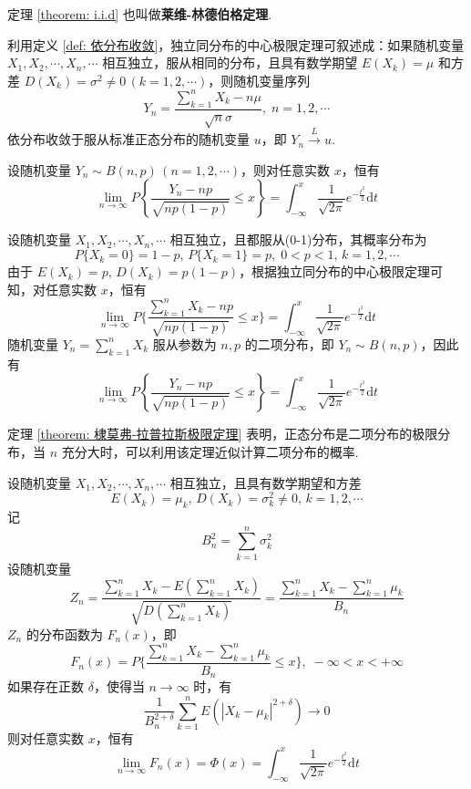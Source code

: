 定理 \ref{theorem: i.i.d} 也叫做\textbf{莱维-林德伯格定理}.

利用定义 \ref{def: 依分布收敛}，独立同分布的中心极限定理可叙述成：如果随机变量 $X_1,X_2,\cdots,X_n,\cdots$ 相互独立，服从相同的分布，且具有数学期望 $E(X_k) = \mu$ 和方差 $D(X_k) = \sigma^2 \not= 0 \, (k=1,2,\cdots)$，则随机变量序列
$$
Y_n = \dfrac{\displaystyle\sum_{k=1}^n X_k - n \mu}{\sqrt{n} \sigma}, \; n=1,2,\cdots
$$
依分布收敛于服从标准正态分布的随机变量 $u$，即 $Y_n \overset{L}{\longrightarrow} u$.

\begin{theorem} \label{theorem: 棣莫弗-拉普拉斯极限定理}
    设随机变量 $Y_n \sim B(n,p) \, (n=1,2,\cdots)$，则对任意实数 $x$，恒有
    $$
    \lim_{n \to \infty} P \left\{ \dfrac{Y_n - np}{\sqrt{np(1-p)}} \leqslant x \right\} = \int_{-\infty}^x \dfrac{1}{\sqrt{2\pi}} e^{-\frac{t^2}{2}} \text{d}t
    $$
\end{theorem}

\begin{myproof}
    设随机变量 $X_1,X_2,\cdots,X_n,\cdots$ 相互独立，且都服从(0-1)分布，其概率分布为
    $$
    P \{ X_k=0 \} = 1-p, \, P \{ X_k=1 \} = p, \; 0 < p < 1, \, k=1,2,\cdots
    $$
    由于 $E(X_k) = p, \, D(X_k) = p(1-p)$，根据独立同分布的中心极限定理可知，对任意实数 $x$，恒有
    $$
    \lim_{n \to \infty} P \Bigg\{ \dfrac{\displaystyle\sum_{k=1}^n X_k - np}{\sqrt{np(1-p)}} \leqslant x \Bigg\} = \int_{-\infty}^x \dfrac{1}{\sqrt{2\pi}} e^{-\frac{t^2}{2}} \text{d}t
    $$
    随机变量 $Y_n = \displaystyle\sum_{k=1}^n X_k$ 服从参数为 $n,p$ 的二项分布，即 $Y_n \sim B(n,p)$，因此有
    $$
    \lim_{n \to \infty} P \left\{ \dfrac{Y_n - np}{\sqrt{np(1-p)}} \leqslant x \right\} = \int_{-\infty}^x \dfrac{1}{\sqrt{2\pi}} e^{-\frac{t^2}{2}} \text{d}t
    $$
\end{myproof}

定理 \ref{theorem: 棣莫弗-拉普拉斯极限定理} 表明，正态分布是二项分布的极限分布，当 $n$ 充分大时，可以利用该定理近似计算二项分布的概率.

\begin{theorem}[（李雅普诺夫定理）]
    设随机变量 $X_1,X_2,\cdots,X_n,\cdots$ 相互独立，且具有数学期望和方差
    $$
    E(X_k) = \mu_k, \, D(X_k) = \sigma_k^2 \not= 0, \, k=1,2,\cdots
    $$
    记
    $$
    B_n^2 = \sum_{k=1}^n \sigma_k^2
    $$
    设随机变量
    $$
    Z_n = \dfrac{\displaystyle\sum_{k=1}^n X_k - E(\displaystyle\sum_{k=1}^n X_k)}{\sqrt{D(\displaystyle\sum_{k=1}^n X_k)}} = \dfrac{\displaystyle\sum_{k=1}^n X_k - \displaystyle\sum_{k=1}^n \mu_k}{B_n}
    $$
    $Z_n$ 的分布函数为 $F_n(x)$，即
    $$
    F_n(x) = P \Bigg\{ \dfrac{\displaystyle\sum_{k=1}^n X_k - \displaystyle\sum_{k=1}^n \mu_k}{B_n} \leqslant x \Bigg\}, \; -\infty < x < +\infty
    $$
    如果存在正数 $\delta$，使得当 $n \to \infty$ 时，有
    $$
    \dfrac{1}{B_n^{2+\delta}} \sum_{k=1}^n E(|X_k - \mu_k|^{2+\delta}) \to 0
    $$
    则对任意实数 $x$，恒有
    $$
    \lim_{n \to \infty} F_n(x) = \varPhi(x) = \int_{-\infty}^x \dfrac{1}{\sqrt{2\pi}} e^{-\frac{t^2}{2}} \text{d}t
    $$
\end{theorem}

